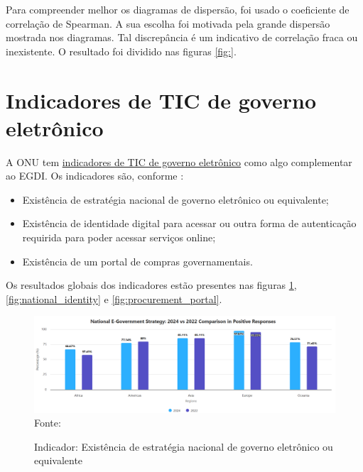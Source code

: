 Para compreender melhor os diagramas de dispersão, foi usado o coeficiente de correlação de Spearman. A sua escolha foi motivada pela grande dispersão mostrada nos diagramas. Tal discrepância é um indicativo de correlação fraca ou inexistente. O resultado foi dividido nas figuras \ref{fig:}.

\section{Indicadores de TIC de governo eletrônico}
\label{indicadores_tic_egov}

A ONU tem \href{https://publicadministration.un.org/egovkb/en-us/Data/ICT-in-government}{indicadores de TIC de governo eletrônico} como algo complementar ao EGDI. Os indicadores são, conforme \cite{ONU_ICT_in_government_indicators}:

\begin{itemize}
    \item Existência de estratégia nacional de governo eletrônico ou equivalente;
    \item Existência de identidade digital para acessar ou outra forma de autenticação requirida para poder acessar serviços online;
    \item Existência de um portal de compras governamentais.
\end{itemize}

Os resultados globais dos indicadores estão presentes nas figuras \ref{fig:national_government_strategy}, \ref{fig:national_identity} e \ref{fig:procurement_portal}.

\begin{figure}[H]
	\centering
	\caption{Indicador: Existência de estratégia nacional de governo eletrônico ou equivalente}
	\includegraphics[width=1\linewidth]{figuras/ict_in_government/national_government_strategy}
	\label{fig:national_government_strategy}
	\footnotesize{Fonte: \cite{ONU_ICT_in_government_indicators}}
\end{figure}

